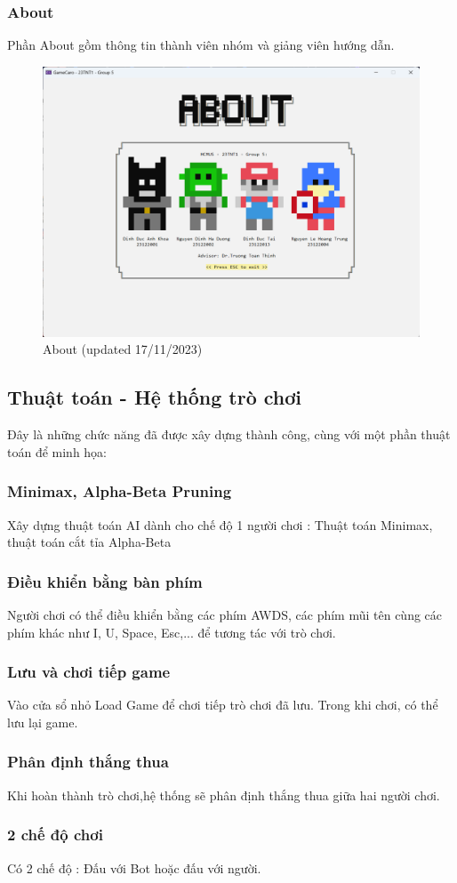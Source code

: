 \subsubsection{About}
Phần About gồm thông tin thành viên nhóm và giảng viên hướng dẫn.
\begin{figure}[H]
    \centering
    \includegraphics[scale=.4]{img/about.png}
    \caption{About (updated 17/11/2023)}
\end{figure}
\clearpage
\subsection{Thuật toán - Hệ thống trò chơi}
Đây là những chức năng đã được xây dựng thành công, cùng với một phần thuật toán để minh họa:
\subsubsection{Minimax, Alpha-Beta Pruning}
Xây dựng thuật toán AI dành cho chế độ 1 người chơi : Thuật toán Minimax, thuật toán cắt tỉa Alpha-Beta

\subsubsection{Điều khiển bằng bàn phím}
Người chơi có thể điều khiển bằng các phím AWDS, các phím mũi tên cùng các phím khác như I, U, Space, Esc,... để tương tác với trò chơi.

\subsubsection{Lưu và chơi tiếp game}
Vào cửa sổ nhỏ Load Game để chơi tiếp trò chơi đã lưu. Trong khi chơi, có thể lưu lại game.

\subsubsection{Phân định thắng thua}
Khi hoàn thành trò chơi,hệ thống sẽ phân định thắng thua giữa hai người chơi. 

\subsubsection{2 chế độ chơi}
Có 2 chế độ : Đấu với Bot hoặc đấu với người.


